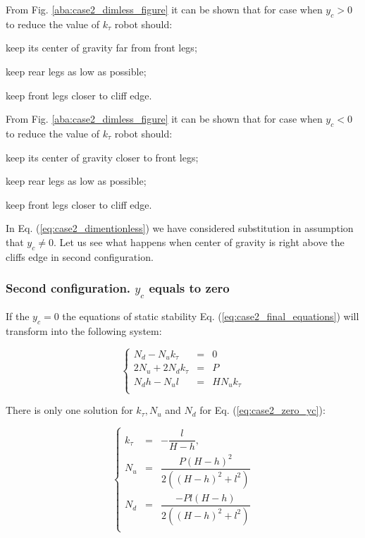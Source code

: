 \documentclass{ws-procs9x6}
\begin{document}
From Fig. \ref{aba:case2_dimless_figure} it can be shown that for case when $y_c>0$ to reduce the value of $k_\tau$ robot should:
\begin{itemlist}
\item keep its center of gravity far from front legs;
\item keep rear legs as low as possible;
\item keep front legs closer to cliff edge.
\end{itemlist}

From Fig. \ref{aba:case2_dimless_figure} it can be shown that for case when $y_c<0$ to reduce the value of $k_\tau$ robot should:
\begin{itemlist}
  \item keep its center of gravity closer to front legs;
  \item keep rear legs as low as possible;
  \item keep front legs closer to cliff edge.
\end{itemlist}

In Eq. (\ref{eq:case2_dimentionless}) we have considered substitution in assumption that $y_c\ne0$. Let us see what happens when center of gravity is right above the cliffs edge in second configuration.

\subsubsection{Second configuration. $y_c$ equals to zero}
If the $y_c = 0$ the equations of static stability Eq. (\ref{eq:case2_final_equations}) will transform into the following system:

\begin{equation}
\label{eq:case2_zero_yc}
\left\{
\begin{array}{lcl}
  N_d - N_uk_\tau &=& 0 \\
  2N_u+2N_dk_\tau &=& P \\
  N_dh - N_ul &=& HN_uk_\tau\\
\end{array}
\right.
\end{equation}

There is only one solution for $k_\tau, N_u$ and $N_d$ for Eq. (\ref{eq:case2_zero_yc}):

\begin{equation}
\label{eq:case2_zero_yc_solution}
\left\{
\begin{array}{lcl}
  k_\tau &=& -\dfrac{l}{H-h},\\
  N_u &=& \dfrac{P(H-h)^2}{2((H-h)^2+l^2)}\\
  N_d &=& \dfrac{-Pl(H - h)}{2((H-h)^2+l^2)}\\
\end{array}
\right.
\end{equation}
\end{document}
